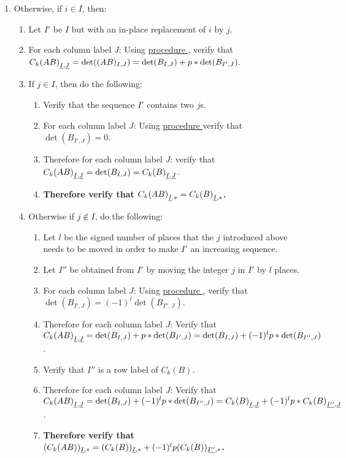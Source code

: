 \documentclass{article}
\newcommand{\ul}[1]{\protect\underline{#1}}
\newcounter{procedure}[part]
\newcommand{\procedurehr}[1]{\hyperref[sec:procedure #1]{procedure \expandafter\csname procedure#1\endcsname}}
\begin{document}
\begin{multicols}{2}
\begin{enumerate}
\begin{enumerate}
\begin{enumerate}
						\end{enumerate}
						\item Otherwise, if $i\in I$, then:
						\begin{enumerate}
							\item Let $I'$ be $I$ but with an in-place replacement of $i$ by $j$.
							\item For each column label $J$: Using \procedurehr{4.12}, verify that ${C_k(AB)}_{\ul{I},\ul{J}}=\det((AB)_{I,J})=\det(B_{I,J})+p*\det(B_{I',J})$.
							\item If $j\in I$, then do the following:
							\begin{enumerate}
								\item Verify that the sequence $I'$ contains two $j$s.
								\item For each column label $J$: Using \procedurehr{4.16} verify that $\det(B_{I',J})=0$.
								\item Therefore for each column label $J$: verify that ${C_k(AB)}_{\ul{I},\ul{J}}=\det(B_{I,J})={C_k(B)}_{\ul{I},\ul{J}}$.
								\item \textbf{Therefore verify that ${C_k(AB)}_{\ul{I},*}={C_k(B)}_{\ul{I},*}$.}
							\end{enumerate}
							\item Otherwise if $j\notin I$, do the following:
							\begin{enumerate}
								\item Let $l$ be the signed number of places that the $j$ introduced above needs to be moved in order to make $I'$ an increasing sequence.
								\item Let $I''$ be obtained from $I'$ by moving the integer $j$ in $I'$ by $l$ places.
								\item For each column label $J$: Using \procedurehr{4.18}, verify that $\det(B_{I',J})=(-1)^l\det(B_{I'',J})$.
								\item Therefore for each column label $J$: Verify that ${C_k(AB)}_{\ul{I},\ul{J}}=\det(B_{I,J})+p*\det(B_{I',J})=\det(B_{I,J})+(-1)^lp*\det(B_{I'',J})$.
								\item Verify that $I''$ is a row label of $C_k(B)$.
								\item Therefore for each column label $J$: Verify that ${C_k(AB)}_{\ul{I},\ul{J}}=\det(B_{I,J})+(-1)^lp*\det(B_{I'',J})={C_k(B)}_{\ul{I},\ul{J}}+(-1)^lp*{C_k(B)}_{\ul{I''},\ul{J}}$.
								\item \textbf{Therefore verify that $(C_k(AB))_{\ul{I},*}=(C_k(B))_{\ul{I},*}+(-1)^lp(C_k(B))_{\ul{I''},*}$.}

\end{enumerate}
\end{enumerate}
\end{enumerate}
\end{enumerate}
\end{multicols}
\end{document}
